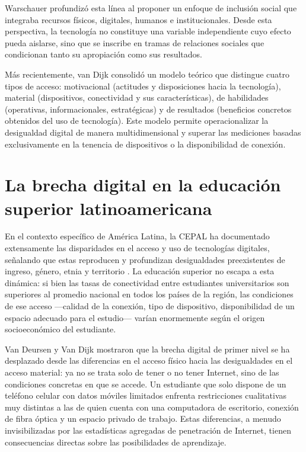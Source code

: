 \documentclass{article}
\begin{document}
Warschauer \autocite*{2562-WARSCHAUER2004} profundizó esta línea al proponer un enfoque de inclusión social que integraba recursos físicos, digitales, humanos e institucionales. Desde esta perspectiva, la tecnología no constituye una variable independiente cuyo efecto pueda aislarse, sino que se inscribe en tramas de relaciones sociales que condicionan tanto su apropiación como sus resultados.

Más recientemente, van Dijk \autocite*{2565-VANDIJK2020} consolidó un modelo teórico que distingue cuatro tipos de acceso: motivacional (actitudes y disposiciones hacia la tecnología), material (dispositivos, conectividad y sus características), de habilidades (operativas, informacionales, estratégicas) y de resultados (beneficios concretos obtenidos del uso de tecnología). Este modelo permite operacionalizar la desigualdad digital de manera multidimensional y superar las mediciones basadas exclusivamente en la tenencia de dispositivos o la disponibilidad de conexión.


\section{La brecha digital en la educación superior latinoamericana}
En el contexto específico de América Latina, la CEPAL ha documentado extensamente las disparidades en el acceso y uso de tecnologías digitales, señalando que estas reproducen y profundizan desigualdades preexistentes de ingreso, género, etnia y territorio \autocite{2566-CEPAL2021}. La educación superior no escapa a esta dinámica: si bien las tasas de conectividad entre estudiantes universitarios son superiores al promedio nacional en todos los países de la región, las condiciones de ese acceso —calidad de la conexión, tipo de dispositivo, disponibilidad de un espacio adecuado para el estudio— varían enormemente según el origen socioeconómico del estudiante.

Van Deursen y Van Dijk \autocite*{2564-VANDEURSEN2019} mostraron que la brecha digital de primer nivel se ha desplazado desde las diferencias en el acceso físico hacia las desigualdades en el acceso material: ya no se trata solo de tener o no tener Internet, sino de las condiciones concretas en que se accede. Un estudiante que solo dispone de un teléfono celular con datos móviles limitados enfrenta restricciones cualitativas muy distintas a las de quien cuenta con una computadora de escritorio, conexión de fibra óptica y un espacio privado de trabajo. Estas diferencias, a menudo invisibilizadas por las estadísticas agregadas de penetración de Internet, tienen consecuencias directas sobre las posibilidades de aprendizaje.
\end{document}

